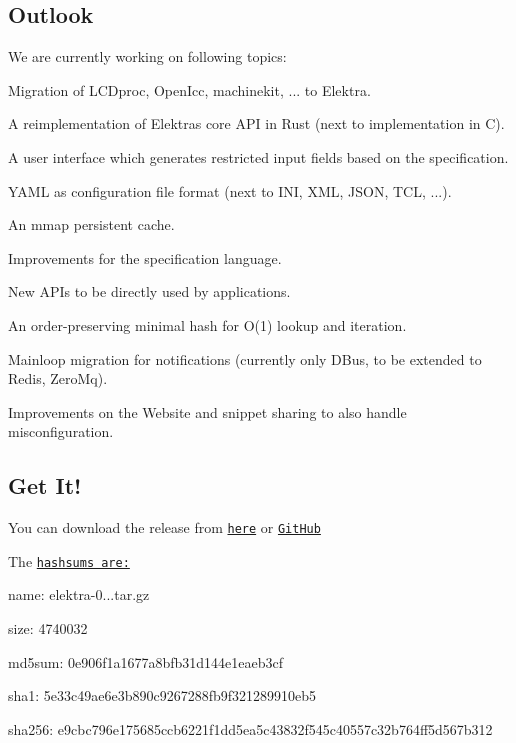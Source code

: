 \subsection*{Outlook}

We are currently working on following topics\+:


\begin{DoxyItemize}
\item Migration of L\+C\+Dproc, Open\+Icc, machinekit, ... to Elektra.
\item A reimplementation of Elektra\textquotesingle{}s core A\+PI in Rust (next to implementation in C).
\item A user interface which generates restricted input fields based on the specification.
\item Y\+A\+ML as configuration file format (next to I\+NI, X\+ML, J\+S\+ON, T\+CL, ...).
\item An mmap persistent cache.
\item Improvements for the specification language.
\item New A\+P\+Is to be directly used by applications.
\item An order-\/preserving minimal hash for O(1) lookup and iteration.
\item Mainloop migration for notifications (currently only D\+Bus, to be extended to Redis, Zero\+Mq).
\item Improvements on the Website and snippet sharing to also handle misconfiguration.
\end{DoxyItemize}

\subsection*{Get It!}

You can download the release from \href{https://www.libelektra.org/ftp/elektra/releases/elektra-0.8.20.tar.gz}{\tt here} or \href{https://github.com/ElektraInitiative/ftp/blob/master/releases/elektra-0.8.20.tar.gz?raw=true}{\tt Git\+Hub}

The \href{https://github.com/ElektraInitiative/ftp/blob/master/releases/elektra-0.8.20.tar.gz.hashsum?raw=true}{\tt hashsums are\+:}


\begin{DoxyItemize}
\item name\+: elektra-\/0...\+tar.\+gz
\item size\+: 4740032
\item md5sum\+: 0e906f1a1677a8bfb31d144e1eaeb3cf
\item sha1\+: 5e33c49ae6e3b890c9267288fb9f321289910eb5
\item sha256\+: e9cbc796e175685ccb6221f1dd5ea5c43832f545c40557c32b764ff5d567b312
\end{DoxyItemize}

